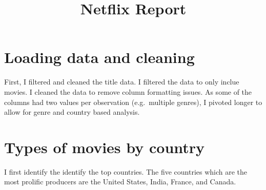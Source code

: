 \documentclass[11pt,preprint]{elsarticle}
\numberwithin{equation}{section}
\numberwithin{figure}{section}
\numberwithin{table}{section}
\begin{document}
\begin{frontmatter}  %

\title{Netflix Report}













\vspace{1cm}





\vspace{0.5cm}

\end{frontmatter}

\setcounter{footnote}{0}



\pagestyle{fancy}
\chead{}
\rhead{}
\lfoot{}
\lhead{}
\cfoot{}


\headsep 35pt %




\section{Loading data and cleaning}\label{loading-data-and-cleaning}

First, I filtered and cleaned the title data. I filtered the data to
only inclue movies. I cleaned the data to remove column formatting
issues. As some of the columns had two values per observation
(e.g.~multiple genres), I pivoted longer to allow for genre and country
based analysis.

\section{Types of movies by country}\label{types-of-movies-by-country}

I first identify the identify the top countries. The five countries
which are the most prolific producers are the United States, India,
France, and Canada.
\end{document}
